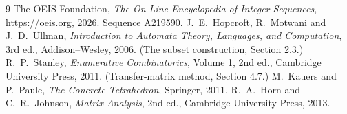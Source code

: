 \documentclass[11pt,a4paper]{article}
\theoremstyle{plain}
\theoremstyle{definition}
\begin{document}
\begin{thebibliography}{9}
 The OEIS Foundation, \emph{The On-Line Encyclopedia of Integer
Sequences}, \url{https://oeis.org}, 2026. Sequence A219590.
 J.~E.~Hopcroft, R.~Motwani and J.~D.~Ullman, \emph{Introduction to Automata
Theory, Languages, and Computation}, 3rd ed., Addison--Wesley, 2006. (The subset
construction, Section 2.3.)
 R.~P.~Stanley, \emph{Enumerative Combinatorics}, Volume 1, 2nd ed.,
Cambridge University Press, 2011. (Transfer-matrix method, Section 4.7.)
 M.~Kauers and P.~Paule, \emph{The Concrete Tetrahedron}, Springer, 2011.
 R.~A.~Horn and C.~R.~Johnson, \emph{Matrix Analysis}, 2nd ed., Cambridge
University Press, 2013.
\end{thebibliography}
\end{document}
